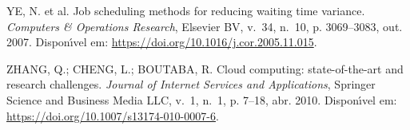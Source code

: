 \documentclass[
	12pt,				%
	openright,			%
	oneside,			%
	a4paper,			%
	brazil				%
	]{abntex2}
\begin{document}
\begin{thebibliography}{}
{YE, N. et al. Job scheduling methods for reducing waiting time variance.
\emph{Computers {\&} Operations Research}, Elsevier {BV}, v.~34, n.~10, p.
  3069--3083, out. 2007.
Dispon{\'\i}vel em: \url{https://doi.org/10.1016/j.cor.2005.11.015}.}

{ZHANG, Q.; CHENG, L.; BOUTABA, R. Cloud computing: state-of-the-art and
  research challenges.
\emph{Journal of Internet Services and Applications}, Springer Science and
  Business Media {LLC}, v.~1, n.~1, p. 7--18, abr. 2010.
Dispon{\'\i}vel em: \url{https://doi.org/10.1007/s13174-010-0007-6}.}

\end{thebibliography}


\printindex
\end{document}
